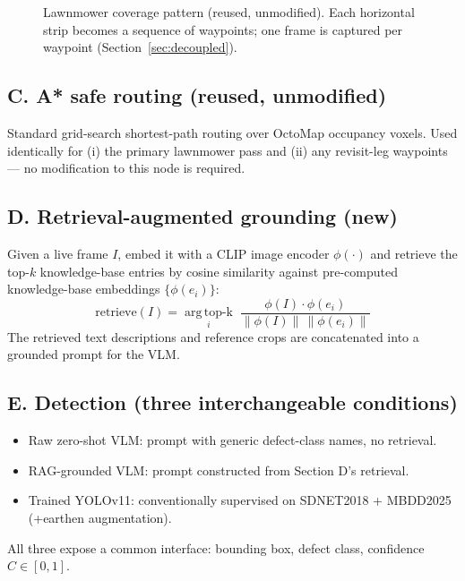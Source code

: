 \documentclass[11pt,a4paper]{article}
\begin{document}
\begin{figure}[h!]
\centering
{}
\caption{Lawnmower coverage pattern (reused, unmodified). Each horizontal strip becomes a sequence of waypoints; one frame is captured per waypoint (Section~\ref{sec:decoupled}).}
\label{fig:lawnmower}
\end{figure}

\subsection{C. A* safe routing (reused, unmodified)}
Standard grid-search shortest-path routing over OctoMap occupancy voxels. Used identically for (i) the primary lawnmower pass and (ii) any revisit-leg waypoints --- no modification to this node is required.

\subsection{D. Retrieval-augmented grounding (new)}
Given a live frame $I$, embed it with a CLIP image encoder $\phi(\cdot)$ and retrieve the top-$k$ knowledge-base entries by cosine similarity against pre-computed knowledge-base embeddings $\{\phi(e_i)\}$:
\begin{equation}
\text{retrieve}(I) = \operatorname*{arg\,top\text{-}k}_{i} \; \frac{\phi(I)\cdot\phi(e_i)}{\lVert\phi(I)\rVert\,\lVert\phi(e_i)\rVert}
\end{equation}
The retrieved text descriptions and reference crops are concatenated into a grounded prompt for the VLM.

\subsection{E. Detection (three interchangeable conditions)}
\begin{itemize}[leftmargin=1.3cm]
    \item[\textbf{Condition A}] Raw zero-shot VLM: prompt with generic defect-class names, no retrieval.
    \item[\textbf{Condition B}] RAG-grounded VLM: prompt constructed from Section D's retrieval.
    \item[\textbf{Condition C}] Trained YOLOv11: conventionally supervised on SDNET2018 + MBDD2025 (+earthen augmentation).
\end{itemize}
All three expose a common interface: bounding box, defect class, confidence $C \in [0,1]$.
\end{document}
